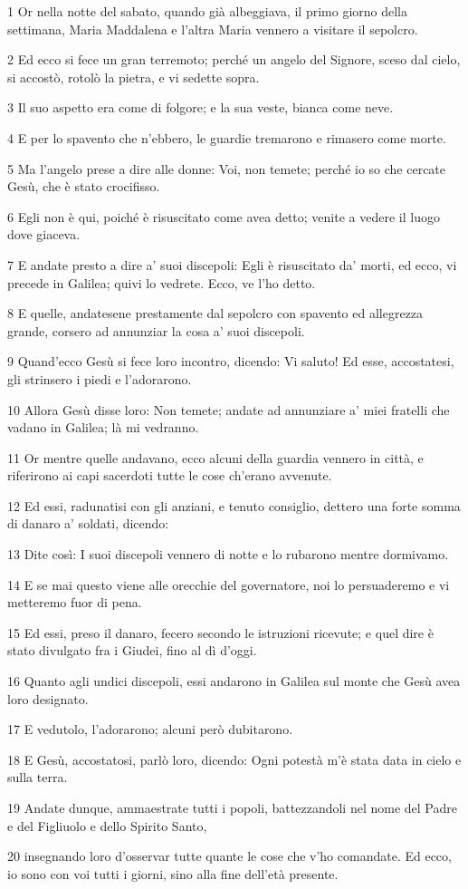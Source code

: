 \par 1 Or nella notte del sabato, quando già albeggiava, il primo giorno della settimana, Maria Maddalena e l'altra Maria vennero a visitare il sepolcro.
\par 2 Ed ecco si fece un gran terremoto; perché un angelo del Signore, sceso dal cielo, si accostò, rotolò la pietra, e vi sedette sopra.
\par 3 Il suo aspetto era come di folgore; e la sua veste, bianca come neve.
\par 4 E per lo spavento che n'ebbero, le guardie tremarono e rimasero come morte.
\par 5 Ma l'angelo prese a dire alle donne: Voi, non temete; perché io so che cercate Gesù, che è stato crocifisso.
\par 6 Egli non è qui, poiché è risuscitato come avea detto; venite a vedere il luogo dove giaceva.
\par 7 E andate presto a dire a' suoi discepoli: Egli è risuscitato da' morti, ed ecco, vi precede in Galilea; quivi lo vedrete. Ecco, ve l'ho detto.
\par 8 E quelle, andatesene prestamente dal sepolcro con spavento ed allegrezza grande, corsero ad annunziar la cosa a' suoi discepoli.
\par 9 Quand'ecco Gesù si fece loro incontro, dicendo: Vi saluto! Ed esse, accostatesi, gli strinsero i piedi e l'adorarono.
\par 10 Allora Gesù disse loro: Non temete; andate ad annunziare a' miei fratelli che vadano in Galilea; là mi vedranno.
\par 11 Or mentre quelle andavano, ecco alcuni della guardia vennero in città, e riferirono ai capi sacerdoti tutte le cose ch'erano avvenute.
\par 12 Ed essi, radunatisi con gli anziani, e tenuto consiglio, dettero una forte somma di danaro a' soldati, dicendo:
\par 13 Dite così: I suoi discepoli vennero di notte e lo rubarono mentre dormivamo.
\par 14 E se mai questo viene alle orecchie del governatore, noi lo persuaderemo e vi metteremo fuor di pena.
\par 15 Ed essi, preso il danaro, fecero secondo le istruzioni ricevute; e quel dire è stato divulgato fra i Giudei, fino al dì d'oggi.
\par 16 Quanto agli undici discepoli, essi andarono in Galilea sul monte che Gesù avea loro designato.
\par 17 E vedutolo, l'adorarono; alcuni però dubitarono.
\par 18 E Gesù, accostatosi, parlò loro, dicendo: Ogni potestà m'è stata data in cielo e sulla terra.
\par 19 Andate dunque, ammaestrate tutti i popoli, battezzandoli nel nome del Padre e del Figliuolo e dello Spirito Santo,
\par 20 insegnando loro d'osservar tutte quante le cose che v'ho comandate. Ed ecco, io sono con voi tutti i giorni, sino alla fine dell'età presente.



